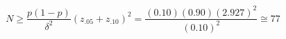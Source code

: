 

\[
N \ge \frac{p(1-p)}{\delta^{2}}(z_{.05} + z_{.10})^{2} = \frac{(0.10)(0.90)(2.927)^2}{(0.10)^{2}} \cong 77
\]


